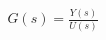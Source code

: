 \documentclass[preview]{standalone}
\begin{document}
\begin{align*}
G(s) = \frac{Y(s)}{U(s)}
\end{align*}
\end{document}
